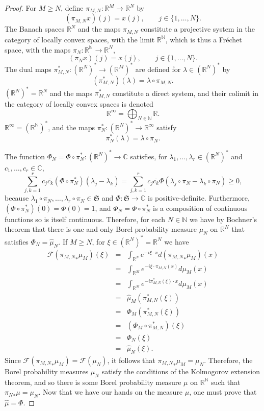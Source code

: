 \documentclass{article}
\theoremstyle{definition}
\begin{document}
\begin{proof}
For $M \geq N$, define $\pi_{M,N}:\mathbb{R}^M \to \mathbb{R}^N$  by
\[
(\pi_{M,N} x)(j) = x(j), \qquad j \in \{1, \ldots, N\}.
\]
 The Banach spaces $\mathbb{R}^N$  and the maps $\pi_{M,N}$ constitute a projective system in the category of locally convex spaces, with 
  the limit $\mathbb{R}^\mathbb{N}$, which is thus a Fr\'echet space,
with the maps
$\pi_N:\mathbb{R}^\mathbb{N} \to \mathbb{R}^N$,
\[
(\pi_N x)(j)=x(j), \qquad j \in \{1,\ldots,N\}.
\]
The dual maps $\pi_{M,N}^*:(\mathbb{R}^N)^* \to (\mathbb{R}^M)^*$ are defined for $\lambda \in (\mathbb{R}^N)^*$ by 
\[
(\pi_{M,N}^*)(\lambda)=\lambda \circ \pi_{M,N}.
\]
$(\mathbb{R}^N)^*=\mathbb{R}^N$ and the maps $\pi_{M,N}^*$ constitute a direct system, and their colimit in the category of locally convex spaces is
denoted
\[
\mathbb{R}^\infty = \bigoplus_{N \in \mathbb{N}} \mathbb{R}.
\]
$\mathbb{R}^\infty = (\mathbb{R}^\mathbb{N})^*$, and
the maps $\pi_N^*:(\mathbb{R}^N)^* \to \mathbb{R}^\infty$ satisfy 
\[
\pi_N^*(\lambda) = \lambda \circ \pi_N.
\]


The function $\Phi_N=\Phi \circ \pi_N^*:(\mathbb{R}^N)^* \to \mathbb{C}$ satisfies, for $\lambda_1,\ldots,\lambda_r \in (\mathbb{R}^N)^*$ and $c_1,\ldots,c_r \in \mathbb{C}$,
\[
\sum_{j,k=1}^r c_j \overline{c_k} (\Phi  \circ \pi_N^*) (\lambda_j-\lambda_k)=\sum_{j,k=1}^r c_j \overline{c_k} \Phi(\lambda_j \circ \pi_N - \lambda_k \circ \pi_N) \geq 0,
\]
because $\lambda_1 \circ \pi_N, \ldots,\lambda_r \circ \pi_N \in \mathfrak{S}$ and $\Phi:\mathfrak{S} \to \mathbb{C}$ is positive-definite.
Furthermore, $(\Phi \circ \pi_N^*)(0) = \Phi(0)=1$, and $\Phi_N=\Phi \circ \pi_N^*$ is a composition of continuous functions so is itself
continuous. Therefore, for each $N \in \mathbb{N}$ we have by Bochner's theorem that there is one and only Borel probability
measure $\mu_N$ on $\mathbb{R}^N$ that satisfies  $\Phi_N = \hat{\mu}_N$. 
If $M \geq N$, for $\xi \in (\mathbb{R}^N)^*=\mathbb{R}^N$ we have
\begin{eqnarray*}
\mathscr{F} ({\pi_{M,N}}_* \mu_M)(\xi)&=&\int_{\mathbb{R}^N} e^{-i\xi\cdot x} d({\pi_{M,N}}_* \mu_M)(x)\\
&=&\int_{\mathbb{R}^M} e^{-i\xi \cdot \pi_{M,N}(x)} d\mu_M(x)\\
&=&\int_{\mathbb{R}^M} e^{-i\pi_{M,N}^*(\xi) \cdot x} d\mu_M(x)\\
&=&\hat{\mu}_M(\pi_{M,N}^*(\xi))\\
&=&\Phi_M(\pi_{M,N}^*(\xi))\\
&=&(\Phi_M \circ \pi_{M,N}^*)(\xi)\\
&=&\Phi_N(\xi)\\
&=&\hat{\mu}_N(\xi).
\end{eqnarray*}
Since $\mathscr{F}({\pi_{M,N}}_* \mu_M)=\mathscr{F}(\mu_N)$, it follows that ${\pi_{M,N}}_* \mu_M=\mu_N$. Therefore, the Borel probability measures $\mu_N$ satisfy
the conditions of the Kolmogorov extension theorem, and so there is some Borel probability measure $\mu$ on $\mathbb{R}^\mathbb{N}$ such that
${\pi_N}_* \mu=\mu_N$.  
Now that we have our hands on the measure $\mu$, one must prove that $\hat{\mu}=\Phi$.



\end{proof}
\end{document}
